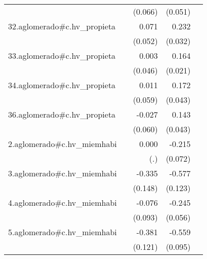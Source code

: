 {\begin{longtable}{l*{4}{D{.}{.}{-1}}}
            &                     &     (0.066)         &     (0.051)         &                     \\
\addlinespace
32.aglomerado#c.hv\_propieta&                     &       0.071         &       0.232\sym{***}&                     \\
            &                     &     (0.052)         &     (0.032)         &                     \\
\addlinespace
33.aglomerado#c.hv\_propieta&                     &       0.003         &       0.164\sym{***}&                     \\
            &                     &     (0.046)         &     (0.021)         &                     \\
\addlinespace
34.aglomerado#c.hv\_propieta&                     &       0.011         &       0.172\sym{***}&                     \\
            &                     &     (0.059)         &     (0.043)         &                     \\
\addlinespace
36.aglomerado#c.hv\_propieta&                     &      -0.027         &       0.143\sym{***}&                     \\
            &                     &     (0.060)         &     (0.043)         &                     \\
\addlinespace
2.aglomerado#c.hv\_miemhabi&                     &       0.000         &      -0.215\sym{**} &                     \\
            &                     &         (.)         &     (0.072)         &                     \\
\addlinespace
3.aglomerado#c.hv\_miemhabi&                     &      -0.335\sym{*}  &      -0.577\sym{***}&                     \\
            &                     &     (0.148)         &     (0.123)         &                     \\
\addlinespace
4.aglomerado#c.hv\_miemhabi&                     &      -0.076         &      -0.245\sym{***}&                     \\
            &                     &     (0.093)         &     (0.056)         &                     \\
\addlinespace
5.aglomerado#c.hv\_miemhabi&                     &      -0.381\sym{**} &      -0.559\sym{***}&                     \\
            &                     &     (0.121)         &     (0.095)         &                     \\

\end{longtable}}
